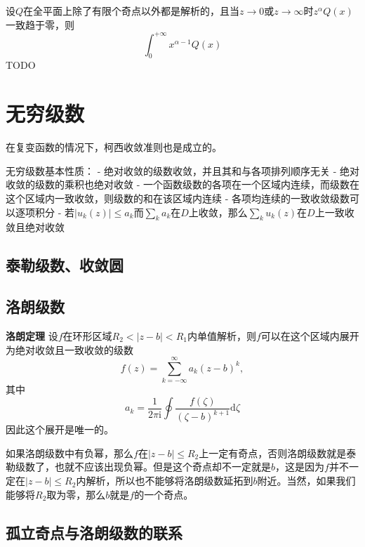 设\(Q\)在全平面上除了有限个奇点以外都是解析的，且当\(z \to 0\)或\(z \to \infty\)时\(z^\alpha Q(x)\)一致趋于零，则
\[
\int_0^{+\infty} x^{\alpha - 1} Q(x)
\] TODO

\hypertarget{ux65e0ux7a77ux7ea7ux6570}{%
\section{无穷级数}\label{ux65e0ux7a77ux7ea7ux6570}}

在复变函数的情况下，柯西收敛准则也是成立的。

无穷级数基本性质： - 绝对收敛的级数收敛，并且其和与各项排列顺序无关 -
绝对收敛的级数的乘积也绝对收敛 -
一个函数级数的各项在一个区域内连续，而级数在这个区域内一致收敛，则级数的和在该区域内连续
- 各项均连续的一致收敛级数可以逐项积分 -
若\(|u_k(z)| \leq a_k\)而\(\sum_k a_k\)在\(D\)上收敛，那么\(\sum_k u_k(z)\)在\(D\)上一致收敛且绝对收敛

\hypertarget{ux6cf0ux52d2ux7ea7ux6570ux6536ux655bux5706}{%
\subsection{泰勒级数、收敛圆}\label{ux6cf0ux52d2ux7ea7ux6570ux6536ux655bux5706}}

\hypertarget{ux6d1bux6717ux7ea7ux6570}{%
\subsection{洛朗级数}\label{ux6d1bux6717ux7ea7ux6570}}

\textbf{洛朗定理}
设\(f\)在环形区域\(R_2 < |z-b| < R_1\)内单值解析，则\(f\)可以在这个区域内展开为绝对收敛且一致收敛的级数
\[
f(z) = \sum_{k=-\infty}^\infty a_k (z-b)^k,
\] 其中 \[
a_k = \frac{1}{2\pi \mathrm{i}} \oint \frac{f(\zeta)}{(\zeta - b)^{k+1}}\mathrm{d}\zeta
\] 因此这个展开是唯一的。

如果洛朗级数中有负幂，那么\(f\)在\(|z-b|\leq R_2\)上一定有奇点，否则洛朗级数就是泰勒级数了，也就不应该出现负幂。但是这个奇点却不一定就是\(b\)，这是因为\(f\)并不一定在\(|z-b|\leq R_2\)内解析，所以也不能够将洛朗级数延拓到\(b\)附近。当然，如果我们能够将\(R_2\)取为零，那么\(b\)就是\(f\)的一个奇点。

\hypertarget{ux5b64ux7acbux5947ux70b9ux4e0eux6d1bux6717ux7ea7ux6570ux7684ux8054ux7cfb}{%
\subsection{孤立奇点与洛朗级数的联系}\label{ux5b64ux7acbux5947ux70b9ux4e0eux6d1bux6717ux7ea7ux6570ux7684ux8054ux7cfb}}

